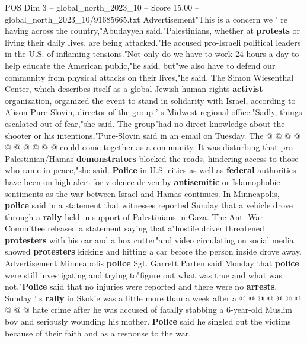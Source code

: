 \begin{textsample}{POS Dim 3 – global\_north\_2023\_10 – Score 15.00 – global\_north\_2023\_10/91685665.txt}
Advertisement"This is a concern we ' re having across the country,"Abudayyeh said."Palestinians, whether at \textbf{protests} or living their daily lives, are being attacked."He accused pro-Israeli political leaders in the U.S. of inflaming tensions."Not only do we have to work 24 hours a day to help educate the American public,"he said, but"we also have to defend our community from physical attacks on their lives,"he said.
The Simon Wiesenthal Center, which describes itself as a global Jewish human rights \textbf{activist} organization, organized the event to stand in solidarity with Israel, according to Alison Pure-Slovin, director of the group ' s Midwest regional office."Sadly, things escalated out of fear,"she said.
The group"had no direct knowledge about the shooter or his intentions,"Pure-Slovin said in an email on Tuesday.
The @ @ @ @ @ @ @ @ @ @ could come together as a community.
It was disturbing that pro-Palestinian/Hamas \textbf{demonstrators} blocked the roads, hindering access to those who came in peace,"she said. \textbf{Police} in U.S. cities as well as \textbf{federal} authorities have been on high alert for violence driven by \textbf{antisemitic} or Islamophobic sentiments as the war between Israel and Hamas continues.
In Minneapolis, \textbf{police} said in a statement that witnesses reported Sunday that a vehicle drove through a \textbf{rally} held in support of Palestinians in Gaza.
The Anti-War Committee released a statement saying that a"hostile driver threatened \textbf{protesters} with his car and a box cutter"and video circulating on social media showed \textbf{protesters} kicking and hitting a car before the person inside drove away.
Advertisement Minneapolis \textbf{police} Sgt.
Garrett Parten said Monday that \textbf{police} were still investigating and trying to"figure out what was true and what was not."\textbf{Police} said that no injuries were reported and there were no \textbf{arrests}.
Sunday ' s \textbf{rally} in Skokie was a little more than a week after a @ @ @ @ @ @ @ @ @ @ hate crime after he was accused of fatally stabbing a 6-year-old Muslim boy and seriously wounding his mother. \textbf{Police} said he singled out the victims because of their faith and as a response to the war.

\end{textsample}
